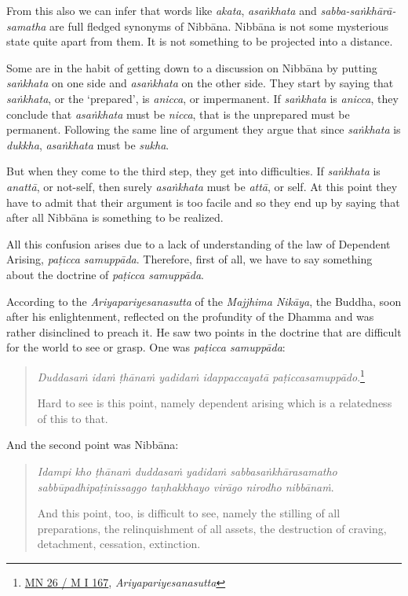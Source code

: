 From this also we can infer that words like \emph{akata}, \emph{asaṅkhata} and \emph{sabba-saṅkhārā-samatha} are full fledged synonyms of Nibbāna. Nibbāna is not some mysterious state quite apart from them. It is not something to be projected into a distance.

Some are in the habit of getting down to a discussion on Nibbāna by putting \emph{saṅkhata} on one side and \emph{asaṅkhata} on the other side. They start by saying that \emph{saṅkhata}, or the `prepared', is \emph{anicca}, or impermanent. If \emph{saṅkhata} is \emph{anicca}, they conclude that \emph{asaṅkhata} must be \emph{nicca}, that is the unprepared must be permanent. Following the same line of argument they argue that since \emph{saṅkhata} is \emph{dukkha}, \emph{asaṅkhata} must be \emph{sukha}.

But when they come to the third step, they get into difficulties. If \emph{saṅkhata} is \emph{anattā}, or not-self, then surely \emph{asaṅkhata} must be \emph{attā}, or self. At this point they have to admit that their argument is too facile and so they end up by saying that after all Nibbāna is something to be realized.

All this confusion arises due to a lack of understanding of the law of Dependent Arising, \emph{paṭicca samuppāda}. Therefore, first of all, we have to say something about the doctrine of \emph{paṭicca samuppāda}.

According to the \emph{Ariyapariyesanasutta} of the \emph{Majjhima Nikāya}, the Buddha, soon after his enlightenment, reflected on the profundity of the Dhamma and was rather disinclined to preach it. He saw two points in the doctrine that are difficult for the world to see or grasp. One was \emph{paṭicca samuppāda}:

\begin{quote}
\emph{Duddasaṁ idaṁ ṭhānaṁ yadidaṁ idappaccayatā paṭiccasamuppādo}.\footnote{\href{https://suttacentral.net/mn26/pli/ms}{MN 26 / M I 167}, \emph{Ariyapariyesanasutta}}

Hard to see is this point, namely dependent arising which is a relatedness of this to that.
\end{quote}

And the second point was Nibbāna:

\begin{quote}
\emph{Idampi kho ṭhānaṁ duddasaṁ yadidaṁ sabbasaṅkhārasamatho sabbūpadhipaṭinissaggo taṇhakkhayo virāgo nirodho nibbānaṁ}.

And this point, too, is difficult to see, namely the stilling of all preparations, the relinquishment of all assets, the destruction of craving, detachment, cessation, extinction.
\end{quote}

